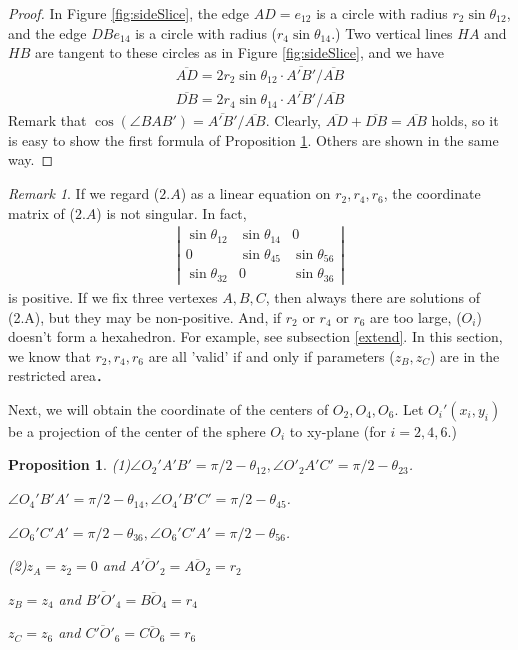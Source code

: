 \documentclass[suppldata, dvipdfmx]{interact}
\theoremstyle{plain}%
\newtheorem{proposition}[theorem]{Proposition}
\theoremstyle{definition}
\theoremstyle{remark}
\newtheorem{remark}{Remark}
\theoremstyle{problemstyle}
\begin{document}
\begin{proof}
 In Figure \ref{fig:sideSlice}, the edge $AD = e_{12}$ is a circle with radius
 $r_2\sin\theta_{12}$, and the edge $DB e_{14}$ is a circle with radius
 ($r_4\sin\theta_{14}$.)
Two vertical lines $HA$ and $HB$ are tangent to these circles as in
 Figure \ref{fig:sideSlice},
 and we have 
 \begin{eqnarray*}
  \overline{AD} = 2 r_2 \sin\theta_{12} \cdot \overline{A'B'}/\overline{AB}\\
  \overline{DB} = 2 r_4 \sin\theta_{14} \cdot \overline{A'B'}/\overline{AB}
 \end{eqnarray*}
 Remark that $\cos(\angle BAB') =\overline{A'B'}/\overline{AB}.$ Clearly,
 $\overline{AD} + \overline{DB} = \overline{AB}$ holds, so it is easy to
 show the first formula of Proposition \ref{angles}. Others are shown in the same
 way.

\end{proof}

\begin{remark}%
 If we regard ($2.A$) as a linear equation on $r_2, r_4, r_6$, the
 coordinate matrix of ($2.A$) is not singular. In fact,
 \begin{eqnarray*}
  \left| 
   \begin{array}{ccc}
    \sin\theta_{12} & \sin\theta_{14} & 0\\
    0               & \sin\theta_{45} & \sin\theta_{56}\\
    \sin\theta_{32} & 0               & \sin\theta_{36}
   \end{array}
  \right|
 \end{eqnarray*}
 is positive.
 If we fix three vertexes $A, B, C$, then always there are solutions of
 (2.A), but they may be non-positive. And, if $r_2$ or $r_4$ or $r_6$
 are too large, ($O_i$) doesn't form a hexahedron. For example, see
 subsection \ref{extend}. In this section, we know that $r_2, r_4, r_6$ are all
 'valid' if and only if parameters ($z_B, z_C$) are in the restricted area．

Next, we will obtain the coordinate of the centers of $O_2, O_4, O_6$.
Let $O_i'(x_i, y_i)$ be a projection of the center of the sphere $O_i$
 to xy-plane (for $i = 2, 4, 6$.)
\end{remark}

\begin{proposition}\label{angles}
 (1)$\angle O_2'A'B' = \pi/2 - \theta_{12}, \angle
 O'_2A'C'=\pi/2-\theta_{23}$.

  $\angle O_4'B'A' = \pi/2 - \theta_{14}, \angle O_4'B'C' = \pi/2 -
 \theta_{45}$.

 $\angle O_6'C'A' = \pi/2 - \theta_{36}, \angle O_6'C'A' = \pi/2 - \theta_{56}$.

 (2)$z_A = z_2 = 0$ and $\overline{A'O'_2} = \overline{AO_2} = r_2$

 $z_B = z_4$ and $\overline{B'O'_4} = \overline{BO_4} = r_4$

 $z_C = z_6$ and $\overline{C'O'_6} = \overline{CO_6} = r_6$
\end{proposition}
\end{document}
